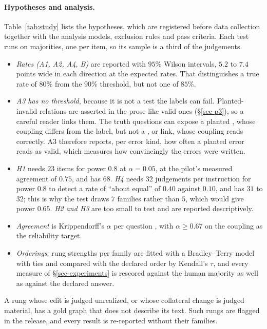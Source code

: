 \paragraph{Hypotheses and analysis.} Table~\ref{tab:study} lists the hypotheses, which are registered before data
collection together with the analysis models, exclusion rules and pass criteria. Each test runs on majorities, one
per item, so its sample is a third of the judgements.
\begin{itemize}[leftmargin=1.4em,itemsep=1pt,topsep=2pt]
\item \emph{Rates (A1, A2, A4, B)} are reported with $95\%$ Wilson intervals, $5.2$ to $7.4$ points wide in each
  direction at the expected rates. That distinguishes a true rate of $80\%$ from the $90\%$ threshold, but not one
  of $85\%$.
\item \emph{A3 has no threshold}, because it is not a test the labels can fail. Planted-invalid relations are
  asserted in the prose like valid ones (\S\ref{sec-p3}), so a careful reader links them. The truth questions can
  expose a planted , whose coupling differs from the label, but not a ,
   or  link, whose coupling reads correctly. A3 therefore reports, per error
  kind, how often a planted error reads as valid, which measures how convincingly the errors were written.
\item \emph{H1} needs $23$ items for power $0.8$ at $\alpha=0.05$, at the pilot's measured agreement of $0.75$, and
  has $68$. \emph{H4} needs $32$ judgements per instruction for power $0.8$ to detect a rate of ``about equal'' of
  $0.40$ against $0.10$, and has $31$ to $32$; this is why the test draws $7$  families rather than
  $5$, which would give power $0.65$. \emph{H2 and H3} are too small to test and are reported descriptively.
\item \emph{Agreement} is Krippendorff's $\alpha$ per question \citep{krippendorff}, with $\alpha \ge 0.67$ on the
  coupling as the reliability target.
\item \emph{Orderings}: rung strengths per family are fitted with a Bradley--Terry model with ties
  \citep{bradleyterry} and compared with the declared order by Kendall's $\tau$, and every measure of
  \S\ref{sec-experiments} is rescored against the human majority as well as against the declared answer.
\end{itemize}
A rung whose edit is judged unrealized, or whose collateral change is judged material, has a gold graph that does
not describe its text. Such rungs are flagged in the release, and every result is re-reported without their
families.

